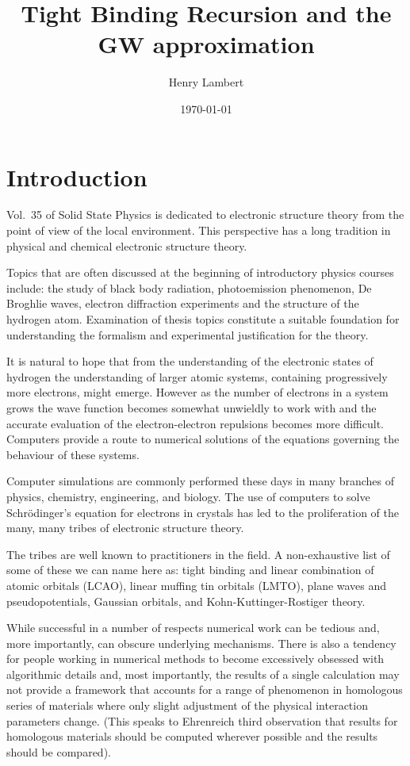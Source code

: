 \documentclass{article}
\begin{document}
\title{Tight Binding Recursion and the GW approximation}
\author{Henry Lambert}
\date{\today}
\maketitle

\section{Introduction}
  Vol.~35 of Solid State Physics is dedicated to electronic structure
theory from the point of view of the local environment. This perspective
has a long tradition in physical and chemical electronic structure theory.

  Topics that are often discussed at the beginning of introductory physics courses include:
the study of black body radiation, photoemission phenomenon, De Broghlie waves,
electron diffraction experiments and the structure of the hydrogen atom.
Examination of thesis topics constitute a suitable foundation 
for understanding the formalism and experimental justification for the theory.

  It is natural to hope that from the understanding of the electronic states of hydrogen the
understanding of larger atomic systems, containing progressively more electrons, might emerge. 
However as the number of electrons in a system grows the wave function becomes 
somewhat unwieldly to work with and the accurate evaluation of the 
electron-electron repulsions becomes more difficult. Computers provide a route
to numerical solutions of the equations governing the behaviour of these systems.

Computer simulations are commonly performed these days in many branches of physics, 
chemistry, engineering, and biology. The use of computers to solve Schr\"odinger's 
equation for electrons in crystals has led to the proliferation of the 
many, many tribes of electronic structure theory. 

The tribes are well known to practitioners in the field. A non-exhaustive list
of some of these we can name here as: tight binding and linear combination of atomic orbitals (LCAO), 
linear muffing tin orbitals (LMTO), plane waves and pseudopotentials, Gaussian orbitals, and 
Kohn-Kuttinger-Rostiger theory.

While successful in a number of respects numerical work can be tedious and, more importantly, can obscure underlying
mechanisms. There is also a tendency for people working in numerical methods to become 
excessively obsessed with algorithmic details and, most importantly,
the results of a single calculation may not provide a framework that accounts for a range
of phenomenon in homologous series of materials where only slight adjustment of the physical
interaction parameters change. (This speaks to Ehrenreich third observation that results for homologous materials should be computed
wherever possible and the results should be compared). 
\end{document}
